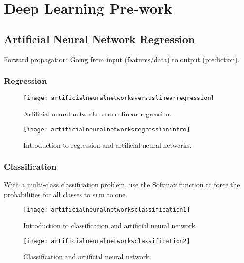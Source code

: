 	\chapter{Deep Learning Pre-work}
	\section{Artificial Neural Network Regression}

Forward propagation: Going from input (features/data) to output (prediction).

	\subsection{Regression}
 	\begin{figure}[htb]
		\centering
		\texttt{[image: artificialneuralnetworksversuslinearregression]}
		\caption[Artificial neural networks versus linear regression]{Artificial neural networks versus linear regression.}
		\label{fig:artificialneuralnetworksversuslinearregression}
	\end{figure}


 	\begin{figure}[htb]
		\centering
		\texttt{[image: artificialneuralnetworksregressionintro]}
		\caption[Introduction to regression and artificial neural networks]{Introduction to regression and artificial neural networks.}
		\label{fig:artificialneuralnetworksregressionintro}
	\end{figure}

	\subsection{Classification}
With a multi-class classification problem, use the Softmax function to force the probabilities for all classes to sum to one.

 	\begin{figure}[htb]
		\centering
		\texttt{[image: artificialneuralnetworksclassification1]}
		\caption[Introduction to classification and artificial neural network]{Introduction to classification and artificial neural network.}
		\label{fig:artificialneuralnetworksclassification1}
	\end{figure}

 	\begin{figure}[htb]
		\centering
		\texttt{[image: artificialneuralnetworksclassification2]}
		\caption[Classification and artificial neural network]{Classification and artificial neural network.}
		\label{fig:artificialneuralnetworksclassification2}
	\end{figure}

